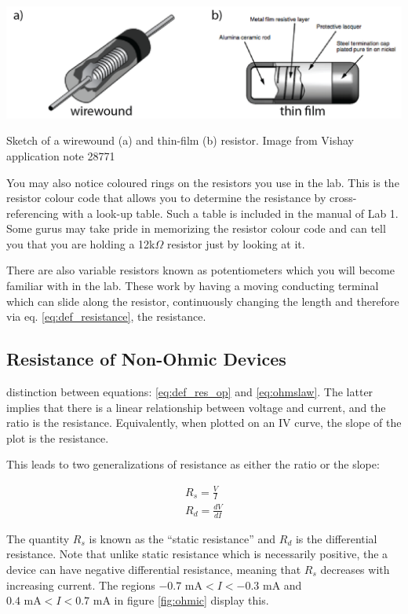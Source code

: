 \documentclass{tufte-book}
\begin{document}
\begin{marginfigure}%
  \includegraphics[width=\linewidth]{someresistors}
\caption{Sketch of a wirewound (a) and thin-film (b) resistor. Image from Vishay application note 28771}
  \label{fig:someresistors}
\end{marginfigure}

You may also notice coloured rings on the resistors you use in the lab. This is the resistor colour code that allows you to determine the resistance by cross-referencing with a look-up table. Such a table is included in the manual of Lab 1.  Some gurus may take pride in memorizing the resistor colour code and can tell you that you are holding a 12k$\Omega$ resistor just by looking at it.

There are also variable resistors known as potentiometers which you will become familiar with in the lab. These work by having a moving conducting terminal which can slide along the resistor, continuously changing the length and therefore via eq. \ref{eq:def_resistance}, the resistance.


\subsection{Resistance of Non-Ohmic Devices}
 distinction between equations: \ref{eq:def_res_op} and \ref{eq:ohmslaw}. The latter implies that there is a linear relationship between voltage and current, and the ratio is the resistance. Equivalently, when plotted on an IV curve, the slope of the plot is the resistance.

This leads to two generalizations of resistance as either the ratio or the slope:

\begin{subequations}
\begin{align}
    R_{s} = \frac{V}{I}\label{eq:genres1}\\
   R_d = \frac{dV}{dI} \label{eq:genres2}
\end{align}
\end{subequations}

The quantity $R_s$ is known as the ``static resistance'' and $R_d$ is the differential resistance. Note that unlike static resistance which is necessarily positive, the a device can have negative differential resistance, meaning that $R_s$ decreases with increasing current. The regions $-0.7\text{ mA}  < I < -0.3\text{ mA}$ and $0.4\text{ mA}  < I < 0.7\text{ mA}$ in figure \ref{fig:ohmic} display this.
\end{document}
